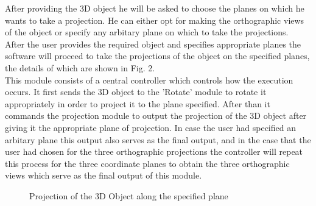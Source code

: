 \documentclass[a4paper,12pt,openany]{report}
\begin{document}
After providing the 3D object he will be asked to choose the planes on which he wants to take a projection. He can either opt for making the orthographic views of the object or specify any arbitary plane on which to take the projections.\\

After the user provides the required object and specifies appropriate planes the software will proceed to take the projections of the object on the specified planes, the details of which are shown in Fig. 2.\\


This module consists of a central controller which controls how the execution occurs. It first sends the 3D object to the 'Rotate' module to rotate it appropriately in order to project it to the plane specified. After than it commands the projection module to output the projection of the 3D object after giving it the appropriate plane of projection. In case the user had specified an arbitary plane this output also serves as the final output, and in the case that the user had chosen for the three orthographic projections the controller will repeat this process for the three coordinate planes to obtain the three orthographic views which serve as the final output of this module. 

\begin{figure}[h]
	\centering
	\caption{Projection of the 3D Object along the specified plane}
\end{figure}
\end{document}
